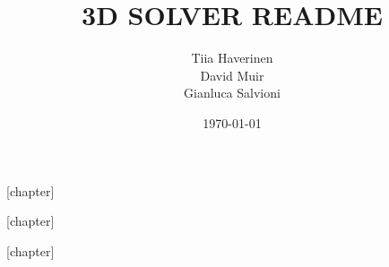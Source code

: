\usepackage[utf8]{inputenc}
\usepackage{amsmath}
\usepackage{amsfonts}

\usepackage{extsizes}
\linespread{1}

\usepackage{color}
\usepackage{xcolor}
\usepackage{adjustbox}
\usepackage{graphicx}
\usepackage{caption}
\usepackage{subcaption}
\usepackage[a4paper, width=150mm, top=25mm, bottom=25mm]{geometry}
\usepackage{fancyhdr}
\pagestyle{fancy}
\fancyhead{}
\fancyfoot{}
\fancyfoot[C]{\thepage}
\renewcommand{\headrulewidth}{0.4pt}
\renewcommand{\footrulewidth}{0.4pt}
\usepackage{natbib}
\usepackage{hyperref} %


\newenvironment{Coloured Box}[2]{
	\begin{adjustbox}{minipage=\textwidth - 1ex, margin=0.5ex, bgcolor=#1, env=center}
		\textbf{#2 \\}
		}{
	\end{adjustbox}
}

[chapter] \setcounter{Example Counter}{0}
\newenvironment{Example}[1]{
	\refstepcounter{Example Counter}\begin{adjustbox}{minipage=\textwidth - 1ex, margin=0.5ex, bgcolor=light-grey, env=center}
		\textbf{Example \arabic{chapter}.\arabic{Example Counter}: #1} \\
		}{
	\end{adjustbox} 
}

[chapter] \setcounter{Lemma Counter}{0}
\newenvironment{Lemma}[1]{\\ \\ \refstepcounter{Lemma Counter}\textbf{Lemma \arabic{chapter}.\arabic{Lemma Counter}: #1} \\ \it}{\\ \par}

[chapter] \setcounter{Definition Counter}{0}
\newenvironment{Definition}[1]{\\ \\ \refstepcounter{Definition Counter}\textbf{Definition \arabic{chapter}.\arabic{Definition Counter}: #1} \\ \it}{\\ \par}

\title{3D SOLVER README}
\author{Tiia Haverinen \\
		David Muir \\
		Gianluca Salvioni}
\date{\today}